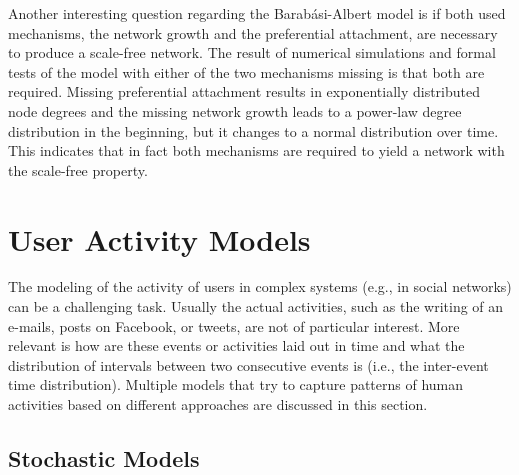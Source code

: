 Another interesting question regarding the Barabási-Albert model is if both used mechanisms, the network growth and the preferential attachment, are necessary to produce a scale-free network.
The result of numerical simulations and formal tests of the model with either of the two mechanisms missing is that both are required.
Missing preferential attachment results in exponentially distributed node degrees and the missing network growth leads to a power-law degree distribution in the beginning, but it changes to a normal distribution over time.
This indicates that in fact both mechanisms are required to yield a network with the scale-free property.




\section{User Activity Models}
\label{sec:user-activity-models}

The modeling of the activity of users in complex systems (e.g., in social networks) can be a challenging task.
Usually the actual activities, such as the writing of an e-mails, posts on  Facebook, or tweets, are not of particular interest.
More relevant is how are these events or activities laid out in time and what  the distribution of intervals between two consecutive events is (i.e., the inter-event time distribution).
Multiple models that try to capture patterns of human activities based on different approaches are discussed in this section.

\subsection{Stochastic Models}

